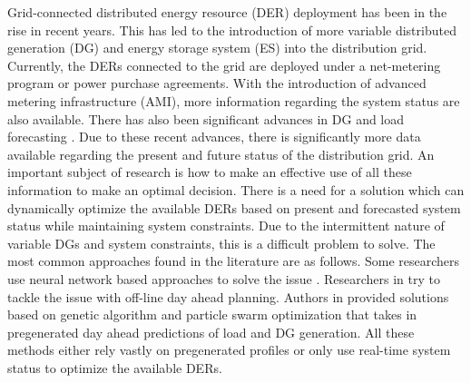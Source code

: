 Grid-connected distributed energy resource (DER) deployment has been in the rise in recent years. This has led to the introduction of more variable distributed generation (DG) and energy storage system (ES) into the distribution grid. Currently, the DERs connected to the grid are deployed under a net-metering program or power purchase agreements. With the introduction of advanced metering infrastructure (AMI), more information regarding the system status are also available. There has also been significant advances in DG and load forecasting \cite{LOAD_FOR1,LOAD_FOR2,LOAD_FOR3,WInd_for_1,ospina2019forecasting}. Due to these recent advances, there is significantly more data available regarding the present and future status of the distribution grid. An important subject of research is how to make an effective use of all these information to make an optimal decision. There is a need for a solution which can dynamically optimize the available DERs based on present and forecasted system status while maintaining system constraints. Due to the intermittent nature of variable DGs and system constraints, this is a difficult problem to solve. The most common approaches found in the literature are as follows. Some researchers use neural network based approaches to solve the issue \cite{OFF_LINE_1}. Researchers in \cite{off_2,off_3,off_4} try to tackle the issue with off-line day ahead planning. Authors in \cite{ANEW1,ANEW2,ANEW3} provided solutions based on genetic algorithm and particle swarm optimization that takes in pregenerated day ahead predictions of load and DG generation. All these methods either rely vastly on pregenerated profiles or only use real-time system status to optimize the available DERs. 

